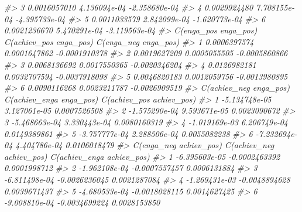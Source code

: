 \documentclass[
]{book}
\newenvironment{Shaded}{\begin{snugshade}}{\end{snugshade}}
\newcommand{\CommentTok}[1]{\textcolor[rgb]{0.56,0.35,0.01}{\textit{#1}}}
\begin{document}
\begin{Shaded}
\begin{Highlighting}[]
\CommentTok{\#\textgreater{} 3        0.0016057010          4.136094e{-}04          {-}2.358680e{-}04}
\CommentTok{\#\textgreater{} 4        0.0029924480          7.708155e{-}04          {-}4.395733e{-}04}
\CommentTok{\#\textgreater{} 5        0.0011033579          2.842099e{-}04          {-}1.620773e{-}04}
\CommentTok{\#\textgreater{} 6        0.0021236670          5.470291e{-}04          {-}3.119563e{-}04}
\CommentTok{\#\textgreater{}   C(enga\_pos enga\_pos) C(achiev\_pos enga\_pos) C(enga\_neg enga\_pos)}
\CommentTok{\#\textgreater{} 1         0.0006397574           0.0001647862        {-}0.0001910378}
\CommentTok{\#\textgreater{} 2         0.0019627209           0.0005055505        {-}0.0005860866}
\CommentTok{\#\textgreater{} 3         0.0068136692           0.0017550365        {-}0.0020346204}
\CommentTok{\#\textgreater{} 4         0.0126982181           0.0032707594        {-}0.0037918098}
\CommentTok{\#\textgreater{} 5         0.0046820183           0.0012059756        {-}0.0013980895}
\CommentTok{\#\textgreater{} 6         0.0090116268           0.0023211787        {-}0.0026909519}
\CommentTok{\#\textgreater{}   C(achiev\_neg enga\_pos) C(achiev\_enga enga\_pos) C(achiev\_pos achiev\_pos)}
\CommentTok{\#\textgreater{} 1          {-}5.134748e{-}05            3.127061e{-}05             0.0007526508}
\CommentTok{\#\textgreater{} 2          {-}1.575290e{-}04            9.593671e{-}05             0.0023090672}
\CommentTok{\#\textgreater{} 3          {-}5.468663e{-}04            3.330443e{-}04             0.0080160319}
\CommentTok{\#\textgreater{} 4          {-}1.019169e{-}03            6.206749e{-}04             0.0149389861}
\CommentTok{\#\textgreater{} 5          {-}3.757777e{-}04            2.288506e{-}04             0.0055082238}
\CommentTok{\#\textgreater{} 6          {-}7.232694e{-}04            4.404786e{-}04             0.0106018479}
\CommentTok{\#\textgreater{}   C(enga\_neg achiev\_pos) C(achiev\_neg achiev\_pos) C(achiev\_enga achiev\_pos)}
\CommentTok{\#\textgreater{} 1          {-}6.395603e{-}05            {-}0.0002463392              0.0001998712}
\CommentTok{\#\textgreater{} 2          {-}1.962108e{-}04            {-}0.0007557457              0.0006131884}
\CommentTok{\#\textgreater{} 3          {-}6.811498e{-}04            {-}0.0026236045              0.0021287084}
\CommentTok{\#\textgreater{} 4          {-}1.269431e{-}03            {-}0.0048894628              0.0039671437}
\CommentTok{\#\textgreater{} 5          {-}4.680533e{-}04            {-}0.0018028115              0.0014627425}
\CommentTok{\#\textgreater{} 6          {-}9.008810e{-}04            {-}0.0034699224              0.0028153850}

\end{Highlighting}
\end{Shaded}
\end{document}
